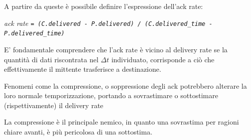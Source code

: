 A partire da queste è possibile definire l'espressione dell'ack rate:

\begin{center}

\textit{ack rate \texttt{= (C.delivered - P.delivered) / (C.delivered\_time - P.delivered\_time)}}

\end{center}

E' fondamentale comprendere che l'ack rate è vicino al delivery rate se la quantità di dati riscontrata nel $ \Delta t$ individuato, corrisponde a ciò che effettivamente il mittente trasferisce a destinazione.\bigskip

Fenomeni come la compressione, o soppressione degli ack potrebbero alterare la loro normale temporizzazione, portando a sovrastimare o sottostimare (rispettivamente) il delivery rate \cite{ietf:ack-suppression} \bigskip

La compressione è il principale nemico, in quanto una sovrastima per ragioni chiare avanti, è più pericolosa di una sottostima. \bigskip


